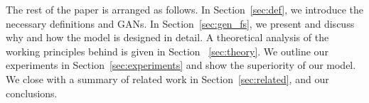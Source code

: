 The rest of the paper is arranged as follows. In Section~\ref{sec:def}, we introduce the necessary definitions and GANs. In Section~\ref{sec:gen_fs}, we present \smodel and discuss why and how the model is designed in detail. A theoretical analysis of the working principles behind \model is given in Section ~\ref{sec:theory}. We outline our experiments in Section~\ref{sec:experiments} and show the superiority of our model. We close with a summary of related work in Section~\ref{sec:related}, and our conclusions.
